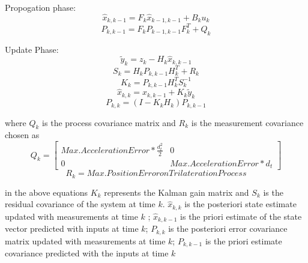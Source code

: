 \documentclass[twoside]{article}
\begin{document}
		Propogation phase:
		\begin{equation}
    \hat{x}_{k,k-1} = F_k\hat{x}_{k-1,k-1} + B_ku_k
		\end{equation}
		\begin{equation}
 P_{k,k-1} = F_k P_{k-1,k-1}F^T_k + Q_k
		\end{equation}
		
		Update Phase:
		\begin{equation}
\tilde{y}_k = z_k - H_k  \hat{x}_{k,k-1} 
\end{equation}
	\begin{equation}
S_k = H_k P_{k,k-1} H^T_k + R_k
\end{equation}
	\begin{equation}
K_k =  P_{k,k-1} H^T_kS_k^{-1}
		\end{equation}
		\begin{equation}
 \hat{x}_{k,k} =  \hat{x}_{k,k-1} + K_k \tilde{y}_k
		\end{equation}
		\begin{equation}
P_{k,k} = (I - K_kH_k)P_{k,k-1}
		\end{equation}
		
		
		where $Q_k$ is the process covariance matrix and $R_k$ is the measurement covariance chosen as 
		\begin{equation}
Q_k = \begin{bmatrix}
Max. Acceleration Error * \frac{d^2_t}{2} & 0 \\
0 & Max. Acceleration Error * d_t
\end{bmatrix}
		\end{equation}
		\begin{equation}
R_k = Max. Position Error on Trilateration Process
		\end{equation}
		
	in the above equations $K_k$ represents the Kalman gain matrix and $S_k$ is the residual covariance of the system at time $k$. $\hat{x}_{k,k}$ is the posteriori state estimate updated with measurements at time $k$ ;  $\hat{x}_{k,k-1}$ is the priori estimate of the state vector predicted with inputs at time $k$; $P_{k,k}$ is the posteriori error covariance matrix updated with measurements at time $k$; $P_{k,k-1}$ is the priori estimate covariance predicted with the inputs at time $k$
		
		
\end{document}

